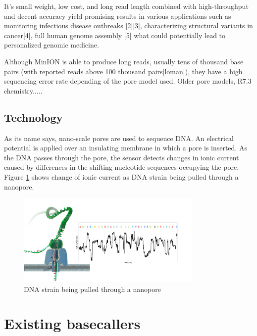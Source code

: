 \documentclass[times, utf8, diplomski, numeric, english]{fer}
\begin{document}
It’s small weight, low cost, and long read length combined with high-throughput and decent accuracy yield promising results in various applications such as monitoring infectious disease outbreaks [2][3], characterizing structural variants in cancer[4], full human genome assembly [5] what could potentially lead to personalized genomic medicine.

Although MinION is able to produce long reads, usually tens of thousand
base pairs (with reported reads above 100 thousand pairs[loman]), they have a high sequencing error
rate depending of the pore model used. Older pore models, R7.3 chemistry.....%





\subsection{Technology}
As its name says, nano-scale pores are used to sequence DNA. An electrical potential is applied over an insulating membrane in which a  pore is inserted. As the DNA passes through the pore, the sensor detects changes in ionic current caused by differences in the shifting nucleotide sequences occupying the pore. Figure \ref{fg:nanopore} shows change of ionic current as DNA strain being pulled through a nanopore.

\begin{figure}[!ht]
	\begin{center}
		\includegraphics[width=0.8\textwidth]{./imgs/nanopore.png}

		\caption[DNA strain being pulled through a nanopore]{DNA strain being pulled through a nanopore \protect\footnotemark}
		\label{fg:nanopore}
	\end{center}
\end{figure}


\section{Existing basecallers}
\end{document}
